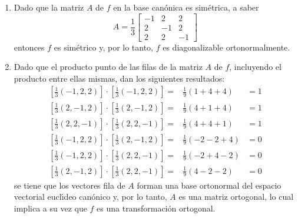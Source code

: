 \begin{solucion}
 $\phantom{0}$
 \begin{enumerate}
  \item Dado que la matriz $A$ de $f$ en la base can\'onica es sim\'etrica, a saber
  \begin{equation*}
   A = \frac{1}{3}
   \begin{bmatrix}
    -1 &  2 &  2 \\
     2 & -1 &  2 \\
     2 &  2 & -1
   \end{bmatrix}
  \end{equation*}
  entonces $f$ es sim\'etrico y, por lo tanto, $f$ es diagonalizable ortonormalmente.
  
  \item Dado que el producto punto de las filas de la matriz $A$ de $f$, incluyendo el producto entre ellas mismas, dan los siguientes resultados:
  \begin{eqnarray*}
   \left[ \frac{1}{3}(-1, 2, 2)\right] \cdot \left[ \frac{1}{3}(-1, 2, 2)\right] = & \frac{1}{9}(1 + 4 + 4) & = 1 \\
   \left[ \frac{1}{3}(2, -1, 2)\right] \cdot \left[ \frac{1}{3}(2, -1, 2)\right] = & \frac{1}{9}(4 + 1 + 4) & = 1 \\
   \left[ \frac{1}{3}(2, 2, -1)\right] \cdot \left[ \frac{1}{3}(2, 2, -1)\right] = & \frac{1}{9}(4 + 4 + 1) & = 1 \\
   \left[ \frac{1}{3}(-1, 2, 2)\right] \cdot \left[ \frac{1}{3}(2, -1, 2)\right] = & \frac{1}{9}(-2 - 2 + 4) & = 0 \\
   \left[ \frac{1}{3}(-1, 2, 2)\right] \cdot \left[ \frac{1}{3}(2, 2, -1)\right] = & \frac{1}{9}(-2 + 4 - 2) & = 0 \\
   \left[ \frac{1}{3}(2, -1, 2)\right] \cdot \left[ \frac{1}{3}(2, 2, -1)\right] = & \frac{1}{9}(4 -2 - 2) & = 0
  \end{eqnarray*}
  se tiene que los vectores fila de $A$ forman una base ortonormal del espacio vectorial eucl\'{\i}deo can\'onico y, por lo tanto, $A$ es una matriz ortogonal, lo cual implica a su vez que $f$ es una transformaci\'on ortogonal.
  

\end{enumerate}
\end{solucion}
